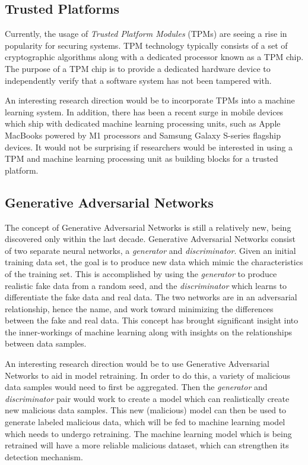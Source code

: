 \documentclass[11pt,conference]{IEEEtran}
\begin{document}
\subsection{Trusted Platforms}
Currently, the usage of \emph{Trusted Platform Modules} (TPMs) are seeing a
rise in popularity for securing systems. TPM technology typically consists of a
set of cryptographic algorithms along with a dedicated processor known as a TPM
chip. The purpose of a TPM chip is to provide a dedicated hardware device to
independently verify that a software system has not been tampered with. 

An interesting research direction would be to incorporate TPMs into a machine
learning system. In addition, there has been a recent surge in mobile devices
which ship with dedicated machine learning processing units, such as Apple
MacBooks powered by M1 processors and Samsung Galaxy S-series flagship devices.
It would not be surprising if researchers would be interested in using a TPM
and machine learning processing unit as building blocks for a trusted platform.

\subsection{Generative Adversarial Networks}
The concept of Generative Adversarial Networks is still a relatively
new, being discovered only within the last decade. Generative Adversarial
Networks consist of two separate neural networks, a \emph{generator}
and \emph{discriminator}. Given an initial training data set, the goal is to
produce new data which mimic the characteristics of the training set. This is
accomplished by using the \emph{generator} to produce realistic fake data from
a random seed, and the \emph{discriminator} which learns to differentiate the
fake data and real data. The two networks are in an adversarial relationship,
hence the name, and work toward minimizing the differences between the fake and
real data. This concept has brought significant insight into the inner-workings
of machine learning along with insights on the relationships between data
samples.

An interesting research direction would be to use Generative Adversarial
Networks to aid in model retraining. In order to do this, a
variety of malicious data samples would need to first be aggregated. Then the
\emph{generator} and \emph{discriminator} pair would work to create a model
which can realistically create new malicious data samples. This new (malicious)
model can then be used to generate labeled malicious data, which will be fed to
machine learning model which needs to undergo retraining. The machine learning
model which is being retrained will have a more reliable malicious dataset,
which can strengthen its detection mechanism.
\end{document}
